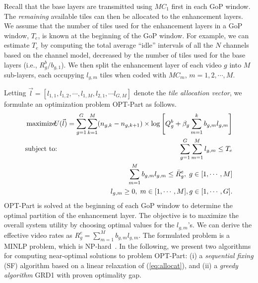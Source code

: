 \documentclass[12pt,onecolumn,draftclsnofoot]{IEEEtran} %
\begin{document}
Recall that the base layers are transmitted using $MC_1$ first in each GoP window. The {\em remaining} available tiles can then be allocated to the enhancement layers.  We assume that the number of tiles used for the enhancement layers in a GoP window, $T_e$, is known at the beginning of the GoP window.  For example, we can estimate $T_e$ by computing the total average ``idle'' intervals of all the $N$ channels based on the channel model, decreased by the number of tiles used for the base layers (i.e., $R^b_g/b_{g,1}$).  We then split the enhancement layer of each video $g$ into $M$ sub-layers, each occupying $l_{g,m}$ tiles when coded with $MC_m$,  $m=1, 2, \cdots, M$. 

Letting $\vec{l} = [l_{1,1}, l_{1,2}, \cdots, l_{1,M}, l_{2,1}, \cdots l_{G,M}]$ denote the {\em tile allocation vector}, we formulate an optimization problem OPT-Part as follows. 
\begin{eqnarray}
 \mbox{maximize:} && \hspace*{-0.2in} U(\vec{l})
  = \sum_{g=1}^{G}\sum_{k=1}^M(n_{g,k}-n_{g,k+1}) \times 
  \log \left[ Q^b_g+\beta_g \sum_{m=1}^k b_{g,m}l_{g,m} \right] \label{eq:allocat} \\
\mbox{subject to:} 
  && \hspace*{-0.2in} \sum_{g=1}^G\sum_{m=1}^M l_{g,m}\le T_e \label{eq:st1} \\
	&& \hspace*{-0.2in} \sum_{m=1}^M b_{g,m}l_{g,m} \le \bar{R}_g^e, \; g \in [1, \cdots, M] 
	       \label{eq:st2} \\
	&& \hspace*{-0.2in} l_{g,m} \geq 0, \; m \in [1, \cdots, M], g \in [1, \cdots, G]. 
	       \label{eq:st3}
\end{eqnarray}
OPT-Part is solved at the beginning of each GoP window to determine the optimal partition of the enhancement layer.  The objective is to maximize the overall system utility by choosing optimal values for the $l_{g,m}$'s.  We can derive the effective video rates as $R^e_g = \sum_{m=1}^M b_{g,m} l_{g,m}$.  The formulated problem is a MINLP problem, which is NP-hard~\cite{Deb08}.  In the following, we present two algorithms for computing near-optimal solutions to problem OPT-Part: (i) a {\em sequential fixing} (SF) algorithm based on a linear relaxation of (\ref{eq:allocat}), and (ii) a {\em greedy algorithm} {GRD1} with proven optimality gap. 


\end{document}
